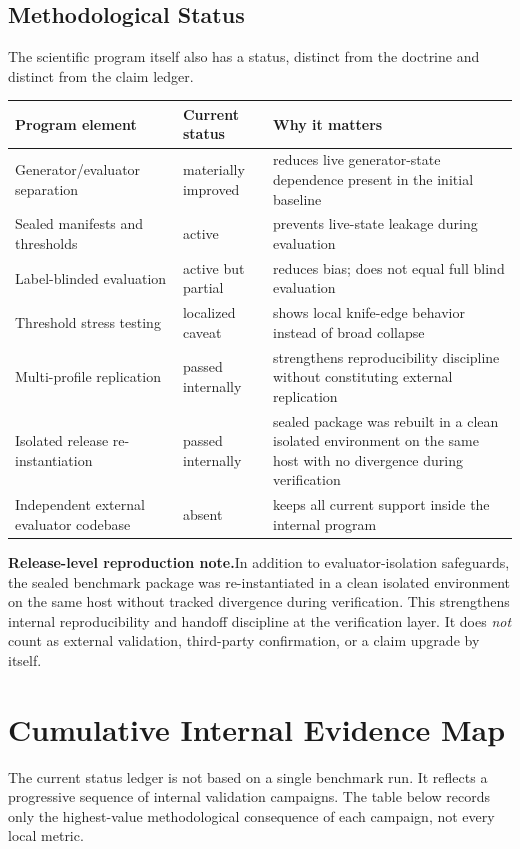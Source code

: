 \documentclass[11pt,a4paper]{article}
\begin{document}
\subsection{Methodological Status}
The scientific program itself also has a status, distinct from the doctrine and distinct from the claim ledger.

\begin{center}
\small
\renewcommand{\arraystretch}{1.18}
\setlength{\tabcolsep}{5pt}
\begin{tabularx}{\linewidth}{@{}lYY@{}}
\toprule
Program element & Current status & Why it matters \\
\midrule
Generator/evaluator separation & materially improved & reduces live generator-state dependence present in the initial baseline \\
Sealed manifests and thresholds & active & prevents live-state leakage during evaluation \\
Label-blinded evaluation & active but partial & reduces bias; does not equal full blind evaluation \\
Threshold stress testing & localized caveat & shows local knife-edge behavior instead of broad collapse \\
Multi-profile replication & passed internally & strengthens reproducibility discipline without constituting external replication \\
Isolated release re-instantiation & passed internally & sealed package was rebuilt in a clean isolated environment on the same host with no divergence during verification \\
Independent external evaluator codebase & absent & keeps all current support inside the internal program \\
\bottomrule
\end{tabularx}
\end{center}

\noindent\textbf{Release-level reproduction note.}\enspace In addition to evaluator-isolation safeguards, the sealed benchmark package was re-instantiated in a clean isolated environment on the same host without tracked divergence during verification. This strengthens internal reproducibility and handoff discipline at the verification layer. It does \emph{not} count as external validation, third-party confirmation, or a claim upgrade by itself.

\section{Cumulative Internal Evidence Map}
The current status ledger is not based on a single benchmark run. It reflects a progressive sequence of internal validation campaigns. The table below records only the highest-value methodological consequence of each campaign, not every local metric.
\end{document}
